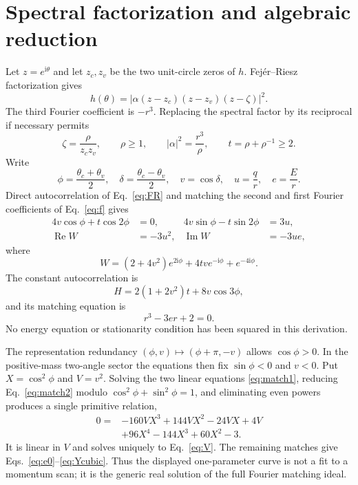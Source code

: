 \documentclass[aps,prb,preprint,superscriptaddress,nofootinbib]{revtex4-2}
\newcommand{\ii}{\mathrm i}
\begin{document}
\section{Spectral factorization and algebraic reduction}
\label{sec:factorization}

Let $z=e^{\ii\theta}$ and let $z_c,z_v$ be the two unit-circle zeros of $h$.
Fej\'er--Riesz factorization gives
\begin{equation}
h(\theta)=\left|\alpha(z-z_c)(z-z_v)(z-\zeta)\right|^2.
\label{eq:FR}
\end{equation}
The third Fourier coefficient is $-r^3$.  Replacing the spectral factor by
its reciprocal if necessary permits
\begin{equation}
\zeta=\frac{\rho}{z_cz_v},\qquad \rho\geq1,\qquad
|\alpha|^2=\frac{r^3}{\rho},\qquad t=\rho+\rho^{-1}\geq2.
\end{equation}
Write
\begin{equation}
\phi=\frac{\theta_c+\theta_v}{2},\quad
\delta=\frac{\theta_c-\theta_v}{2},\quad v=\cos\delta,
\quad u=\frac qr,\quad e=\frac Er.
\end{equation}
Direct autocorrelation of Eq.~\eqref{eq:FR} and matching the second and first
Fourier coefficients of Eq.~\eqref{eq:f} gives
\begin{align}
4v\cos\phi+t\cos2\phi&=0,&
4v\sin\phi-t\sin2\phi&=3u,\label{eq:match1}\\
\operatorname{Re}W&=-3u^2,&
\operatorname{Im}W&=-3ue,\label{eq:match2}
\end{align}
where
\begin{equation}
W=(2+4v^2)e^{2\ii\phi}+4tv e^{-\ii\phi}+e^{-4\ii\phi}.
\end{equation}
The constant autocorrelation is
\begin{equation}
H=2(1+2v^2)t+8v\cos3\phi,
\end{equation}
and its matching equation is
\begin{equation}
[H+e^3-3e(1+u^2)]r^3-3er+2=0.
\label{eq:constantmatch}
\end{equation}
No energy equation or stationarity condition has been squared in this
derivation.

The representation redundancy $(\phi,v)\mapsto(\phi+\pi,-v)$ allows
$\cos\phi>0$.  In the positive-mass two-angle sector the equations then fix
$\sin\phi<0$ and $v<0$.  Put $X=\cos^2\phi$ and $V=v^2$.  Solving the two
linear equations \eqref{eq:match1}, reducing Eq.~\eqref{eq:match2} modulo
$\cos^2\phi+\sin^2\phi=1$, and eliminating even powers produces a single
primitive relation,
\begin{align}
0={}&-160VX^3+144VX^2-24VX+4V\nonumber\\
&+96X^4-144X^3+60X^2-3.
\label{eq:primitive}
\end{align}
It is linear in $V$ and solves uniquely to Eq.~\eqref{eq:V}.  The remaining
matches give Eqs.~\eqref{eq:e0}--\eqref{eq:Ycubic}.  Thus the displayed
one-parameter curve is not a fit to a momentum scan; it is the generic real
solution of the full Fourier matching ideal.
\end{document}
